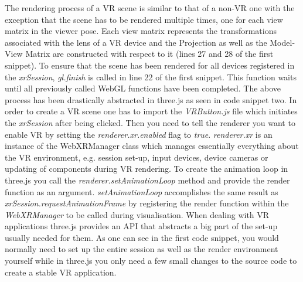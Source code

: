The rendering process of a VR scene is similar to that of a non-VR one with the exception that the scene has to be rendered multiple times, one for each view matrix in the viewer pose. Each view matrix represents the transformations associated with the lens of a VR device and the Projection as well as the Model-View Matrix are constructed with respect to it (lines 27 and 28 of the first snippet). To ensure that the scene has been rendered for all devices registered in the \textit{xrSession}, \textit{gl.finish} is called in line 22 of the first snippet. This function waits until all previously called WebGL functions have been completed.
The above process has been drastically abstracted in three.js as seen in code snippet two. In order to create a VR scene one has to import the \textit{VRButton.js} file which initiates the \textit{xrSession} after being clicked. Then you need to tell the renderer you want to enable VR by setting the \textit{renderer.xr.enabled} flag to \textit{true}. \textit{renderer.xr} is an instance of the WebXRManager class which manages essentially everything about the VR environment, e.g. session set-up, input devices, device cameras or updating of components during VR rendering. To create the animation loop in three.js you call the \textit{renderer.setAnimationLoop} method and provide the render function as an argument. \textit{setAnimationLoop} accomplishes the same result as \textit{xrSession.requestAnimationFrame} by registering the render function within the \textit{WebXRManager} to be called during visualisation. 
When dealing with VR applications three.js provides an API that abstracts a big part of the set-up usually needed for them. As one can see in the first code snippet, you would normally need to set up the entire session as well as the render environment yourself while in three.js you only need a few small changes to the source code to create a stable VR application. 
